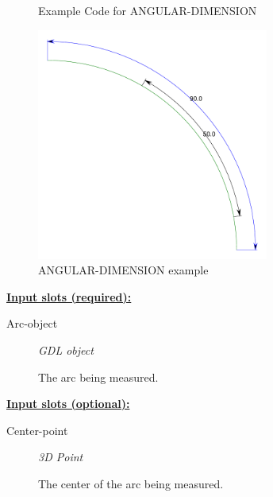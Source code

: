 \documentclass [11pt]{book}
\begin{document}
\begin{itemize}
\begin{figure}
\caption{Example Code for ANGULAR-DIMENSION}

\label{fig:example-code-ANGULAR-DIMENSION}

\end{figure}

\begin{figure}
\begin{center}
\includegraphics[width=3in,height=3in]{../images/example-ANGULAR-DIMENSION.pdf}
\end{center}

\caption{ANGULAR-DIMENSION example}

\label{fig:ANGULAR-DIMENSION}

\end{figure}





\textbf{
\underline{Input slots (required):}}

\begin{description}

\item [Arc-object]
\emph{GDL object}

 The arc being measured.




\end{description}






\textbf{
\underline{Input slots (optional):}}

\begin{description}

\item [Center-point]
\emph{3D Point}

 The center of the arc being measured.





\end{description}
\end{itemize}
\end{document}

